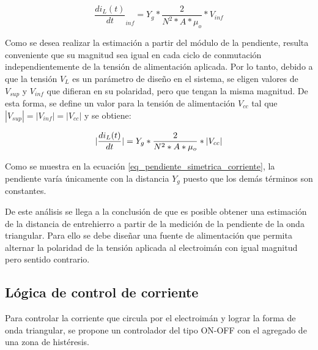 \begin{equation}
	\frac{di_L(t)}{dt}_{inf}= Y_g*\frac{2}{N^2*A*\mu_o}*V_{inf}
\end{equation}
%
%

Como se desea realizar la estimación a partir del módulo de la pendiente, resulta conveniente que su magnitud sea igual en cada ciclo de conmutación independientemente de la tensión de alimentación aplicada. Por lo tanto, debido a que la tensión $V_L$ es un parámetro de diseño en el sistema, se eligen valores de $V_{sup}$ y $V_{inf}$ que difieran en su polaridad, pero que tengan la misma magnitud. De esta forma, se define un valor para la tensión de alimentación $V_{cc}$ tal que $|V_{sup}|=|V_{inf}|=|V_{cc}|$ y se obtiene:
 
\begin{equation} \label{eq_pendiente_simetrica_corriente}
	\lvert\frac{di_L(t)}{dt}\rvert= Y_g*\frac{2}{N^2*A*\mu_o}*\lvert V_{cc}\rvert
\end{equation}

Como se muestra en la ecuación \ref{eq_pendiente_simetrica_corriente}, la pendiente varía únicamente con la distancia $Y_g$ puesto que los demás términos son constantes. 

De este análisis se llega a la conclusión de que es posible obtener una estimación de la distancia de entrehierro a partir de la medición de la pendiente de la onda triangular. Para ello se debe diseñar una fuente de alimentación que permita alternar la polaridad de la tensión aplicada al electroimán con igual magnitud pero sentido contrario.

\subsection{Lógica de control de corriente}

Para controlar la corriente que circula por el electroimán y lograr la forma de onda triangular, se propone un controlador del tipo ON-OFF con el agregado de una zona de histéresis.

